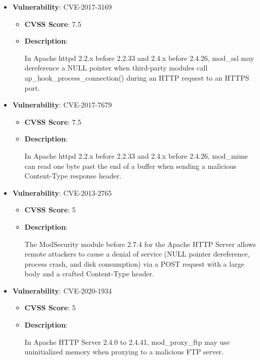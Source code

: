 \documentclass{article}
\begin{document}
\begin{itemize}
        \item \textbf{Vulnerability}: CVE-2017-3169
        \begin{itemize}
            \item \textbf{CVSS Score}:  7.5 
            \item \textbf{Description}:
            \parbox[t]{0.9\linewidth}{
                \ttfamily In Apache httpd 2.2.x before 2.2.33 and 2.4.x before 2.4.26, mod\_ssl may dereference a NULL pointer when third-party modules call ap\_hook\_process\_connection() during an HTTP request to an HTTPS port.
            }
        \end{itemize}
    
        \item \textbf{Vulnerability}: CVE-2017-7679
        \begin{itemize}
            \item \textbf{CVSS Score}:  7.5 
            \item \textbf{Description}:
            \parbox[t]{0.9\linewidth}{
                \ttfamily In Apache httpd 2.2.x before 2.2.33 and 2.4.x before 2.4.26, mod\_mime can read one byte past the end of a buffer when sending a malicious Content-Type response header.
            }
        \end{itemize}
    
        \item \textbf{Vulnerability}: CVE-2013-2765
        \begin{itemize}
            \item \textbf{CVSS Score}:  5 
            \item \textbf{Description}:
            \parbox[t]{0.9\linewidth}{
                \ttfamily The ModSecurity module before 2.7.4 for the Apache HTTP Server allows remote attackers to cause a denial of service (NULL pointer dereference, process crash, and disk consumption) via a POST request with a large body and a crafted Content-Type header.
            }
        \end{itemize}
    
        \item \textbf{Vulnerability}: CVE-2020-1934
        \begin{itemize}
            \item \textbf{CVSS Score}:  5 
            \item \textbf{Description}:
            \parbox[t]{0.9\linewidth}{
                \ttfamily In Apache HTTP Server 2.4.0 to 2.4.41, mod\_proxy\_ftp may use uninitialized memory when proxying to a malicious FTP server.
            }
        \end{itemize}
    

\end{itemize}
\end{document}
